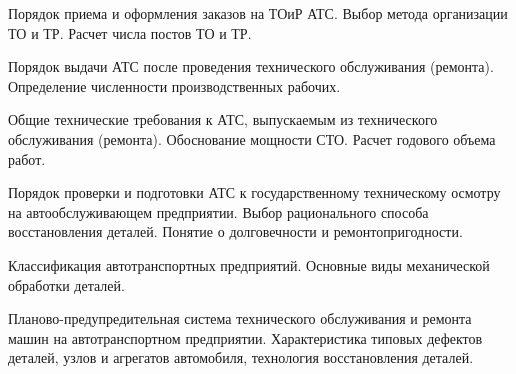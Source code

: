 \documentclass[
	14pt,
	a4paper,
	]
	{scrartcl}
\begin{document}
\vfill

\newpage


\shapk
{}
\setcounter{zad}{0}

\vfill
\z Порядок приема и оформления заказов на ТОиР АТС.
 \vfill
\z Выбор метода организации ТО и ТР. Расчет числа постов ТО и ТР.
 \vfill

\vfill

\newpage


\shapk
{}
\setcounter{zad}{0}

\vfill
\z Порядок выдачи АТС после проведения технического обслуживания (ремонта).
 \vfill
\z Определение численности производственных рабочих. 
 \vfill

\vfill

\newpage


\shapk
{}
\setcounter{zad}{0}

\vfill
\z Общие технические требования к АТС, выпускаемым из технического обслуживания (ремонта).
 \vfill
\z Обоснование мощности СТО. Расчет годового объема работ. 
 \vfill

\vfill

\newpage


\shapk
{}
\setcounter{zad}{0}

\vfill
\z Порядок проверки и подготовки АТС к государственному техническому осмотру на автообслуживающем предприятии.
 \vfill
\z Выбор рационального способа восстановления деталей. Понятие о долговечности и ремонтопригодности.
 \vfill

\vfill

\newpage


\shapk
{}
\setcounter{zad}{0}

\vfill
\z Классификация автотранспортных предприятий. 
 \vfill
\z Основные виды механической обработки деталей.
 \vfill

\vfill

\newpage


\shapk
{}
\setcounter{zad}{0}

\vfill
\z Планово-предупредительная система технического обслуживания и ремонта машин на автотранспортном предприятии.
 \vfill
\z Характеристика типовых дефектов деталей, узлов и агрегатов автомобиля, технология восстановления деталей. 
 \vfill

\vfill

\newpage


\shapk
{}
\setcounter{zad}{0}
\end{document}
